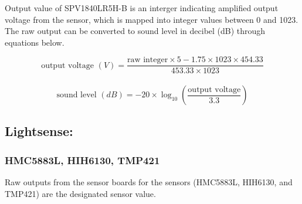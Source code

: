 Output value of SPV1840LR5H-B is an interger indicating amplified output voltage from the sensor, which is mapped into integer values between 0 and 1023. The raw output can be converted to sound level in decibel (dB) through equations below.

\bigbreak

{\centering
 \[ \text{output voltage }(V) = \frac{\text{raw integer} \times 5 - 1.75 \times 1023 \times 454.33}{453.33 \times 1023} \] \\
 \[ \text{sound level } (dB) = -20 \times \log_{10} \left( \frac{\text{output voltage}}{3.3}\right) \]
 \par
 }



%  
% 

\bigbreak
\subsection{Lightsense:}
\subsubsection{ HMC5883L, HIH6130, TMP421}

Raw outputs from the sensor boards for the sensors (HMC5883L, HIH6130, and TMP421) are the designated sensor value.


